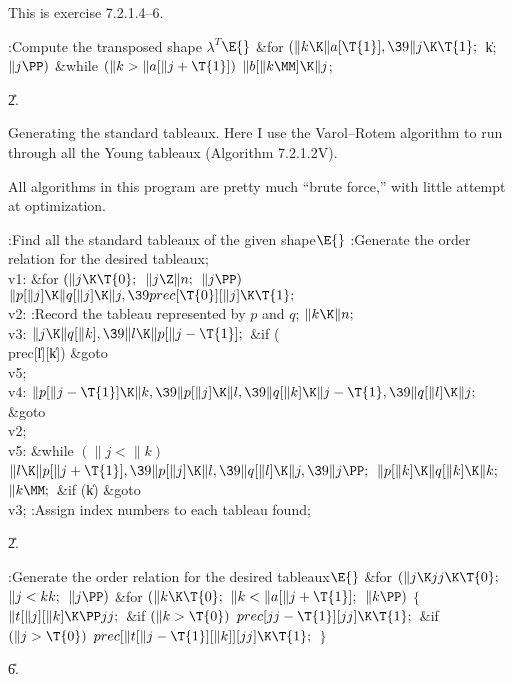 This is exercise 7.2.1.4--6.

\Y\B\4:Compute the transposed shape $\lambda^T$\X${}\E{}$\6
\&{for} ${}(\|k\K\|a[\T{1}],\39\|j\K\T{1};{}$ \|k; ${}\|j\PP){}$\1\6
\&{while} ${}(\|k>\|a[\|j+\T{1}]){}$\1\5
${}\|b[\|k\MM]\K\|j{}$;\2\2\par
\U2.\fi

Generating the standard tableaux. Here I use the Varol--Rotem algorithm
to run through all the Young tableaux (Algorithm 7.2.1.2V).

All algorithms in this program are pretty much ``brute force,'' with
little attempt at optimization.

\Y\B\4:Find all the standard tableaux of the given shape\X${}\E{}$\6
:Generate the order relation for the desired tableaux\X;\6
\4\\{v1}:\5
\&{for} ${}(\|j\K\T{0};{}$ ${}\|j\Z\|n;{}$ ${}\|j\PP){}$\1\5
${}\|p[\|j]\K\|q[\|j]\K\|j,\39\\{prec}[\T{0}][\|j]\K\T{1};{}$\2\6
\4\\{v2}:\5
:Record the tableau represented by $p$ and $q$\X;\6
${}\|k\K\|n;{}$\6
\4\\{v3}:\5
${}\|j\K\|q[\|k],\39\|l\K\|p[\|j-\T{1}];{}$\6
\&{if} (\\{prec}[\|l][\|k])\1\5
\&{goto} \\{v5};\2\6
\4\\{v4}:\5
${}\|p[\|j-\T{1}]\K\|k,\39\|p[\|j]\K\|l,\39\|q[\|k]\K\|j-\T{1},\39\|q[\|l]\K%
\|j;{}$\6
\&{goto} \\{v2};\6
\4\\{v5}:\5
\&{while} ${}(\|j<\|k){}$\1\5
${}\|l\K\|p[\|j+\T{1}],\39\|p[\|j]\K\|l,\39\|q[\|l]\K\|j,\39\|j\PP;{}$\2\6
${}\|p[\|k]\K\|q[\|k]\K\|k;{}$\6
${}\|k\MM;{}$\6
\&{if} (\|k)\1\5
\&{goto} \\{v3};\2\6
:Assign index numbers to each tableau found\X;\par
\U2.\fi

\B{}:Generate the order relation for the desired tableaux\X${}\E{}$\6
\&{for} ${}(\|j\K\\{jj}\K\T{0};{}$ ${}\|j<\\{kk};{}$ ${}\|j\PP){}$\1\6
\&{for} ${}(\|k\K\T{0};{}$ ${}\|k<\|a[\|j+\T{1}];{}$ ${}\|k\PP){}$\5
${}\{{}$\1\6
${}\|t[\|j][\|k]\K\PP\\{jj};{}$\6
\&{if} ${}(\|k>\T{0}){}$\1\5
${}\\{prec}[\\{jj}-\T{1}][\\{jj}]\K\T{1};{}$\2\6
\&{if} ${}(\|j>\T{0}){}$\1\5
${}\\{prec}[\|t[\|j-\T{1}][\|k]][\\{jj}]\K\T{1};{}$\2\6
\4${}\}{}$\2\2\par
\U6.\fi

